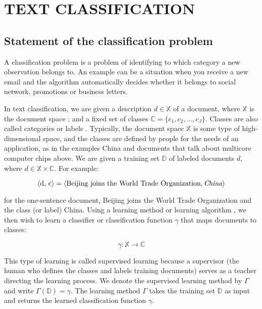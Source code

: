 \chapter{TEXT CLASSIFICATION} \label{chapt1}
\section{Statement of the classification problem} \label{sect1_2}


A classification problem is a problem of identifying to which category a new observation belongs to. An example can be a situation when you receive a new email and the algorithm automatically decides whether it belongs to social network, promotions or business letters.


\newcommand{\docsetlabeled}{\mathbb{D}}

In text classification, we are given a description  $d \in \mathbb{X}$ of a document, where $\mathbb{X}$ is the document space ; and a fixed set of classes  $\mathbb{C} = \{ c_1,c_2,\ldots,c_J \}$. Classes are also called categories or labels . Typically, the document space  $\mathbb{X}$ is some type of high-dimensional space, and the classes are defined by people for the needs of an application, as in the examples China and documents that talk about multicore computer chips above. We are given a training set  $\docsetlabeled$ of labeled documents  $d $, where  $d \in \mathbb{X} \times \mathbb{C}$. For example: 

\begin{equation}
\label{eq:equation3}
\langle\mbox{d, c}\rangle=\langle\mbox{Beijing joins the World Trade Organization}, \emph{China}\rangle
\end{equation}
\begin{doublespacing}
\end{doublespacing}

for the one-sentence document, Beijing joins the World Trade Organization and the class (or label) China.
Using a learning method or learning algorithm , we then wish to learn a classifier or classification function  $\gamma $ that maps documents to classes:

\begin{equation}
	\label{eq:equation4}
	\gamma: \mathbb{X} \rightarrow \mathbb{C}
\end{equation}
\begin{doublespacing}
\end{doublespacing}

This type of learning is called supervised learning because a supervisor (the human who defines the classes and labels training documents) serves as a teacher directing the learning process. We denote the supervised learning method by $\Gamma$ and write  $\Gamma(\docsetlabeled) = \gamma$. The learning method $\Gamma$ takes the training set  $\docsetlabeled$ as input and returns the learned classification function $\gamma $.

